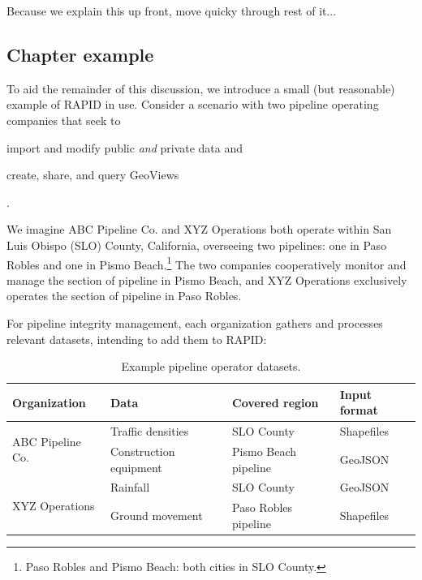 Because we explain this up front, move quicky through rest of it...

\subsection{Chapter example}
To aid the remainder of this discussion, we introduce a small (but reasonable) example of RAPID in use. Consider a scenario with two pipeline operating companies that seek to
\begin{enumerate*}[label=\itshape\alph*\upshape)]
\item import and modify public \textit{and} private data and
\item create, share, and query GeoViews
\end{enumerate*}.

We imagine ABC Pipeline Co. and XYZ Operations both operate within San Luis Obispo (SLO) County, California, overseeing two pipelines: one in Paso Robles and one in Pismo Beach.\footnote{Paso Robles and Pismo Beach: both cities in SLO County.} The two companies cooperatively monitor and manage the section of pipeline in Pismo Beach, and XYZ Operations exclusively operates the section of pipeline in Paso Robles.

For pipeline integrity management, each organization gathers and processes relevant datasets, intending to add them to RAPID:
\begin{table}
\caption{Example pipeline operator datasets.}
\begin{tabular}{ |l|l|l|l| }
\hline
Organization & Data & Covered region & Input format\\
\hline
\multirow{2}{*}{ABC Pipeline Co.}
 & Traffic densities & SLO County & Shapefiles \\ \cline{2-4}
 & Construction equipment & Pismo Beach pipeline & GeoJSON \\ \hline
\multirow{2}{*}{XYZ Operations}
 & Rainfall & SLO County & GeoJSON \\ \cline{2-4}
 & Ground movement & Paso Robles pipeline & Shapefiles \\ \hline
\end{tabular}
\end{table}

